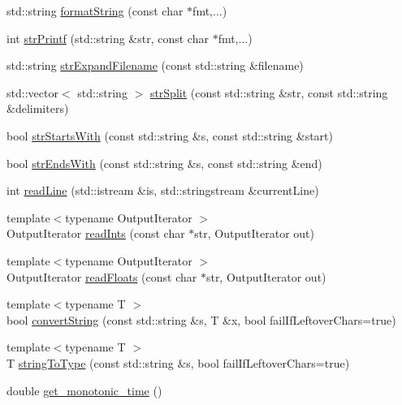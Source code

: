 \begin{DoxyCompactItemize}
\item 
std\+::string \mbox{\hyperlink{group__utils_gadc1d37473e0e8c6a73fb46b19239d2d1}{format\+String}} (const char $\ast$fmt,...)
\item 
int \mbox{\hyperlink{group__utils_gacce5cae59e8c97bf3f4ff581c6534d03}{str\+Printf}} (std\+::string \&str, const char $\ast$fmt,...)
\item 
std\+::string \mbox{\hyperlink{group__utils_ga45c2648d8a8a5f5bed13741bc8a501d1}{str\+Expand\+Filename}} (const std\+::string \&filename)
\item 
std\+::vector$<$ std\+::string $>$ \mbox{\hyperlink{group__utils_ga0a56de67e98afa3f8307e7b4ddb4cc83}{str\+Split}} (const std\+::string \&str, const std\+::string \&delimiters)
\item 
bool \mbox{\hyperlink{group__utils_ga98f10a2fabad17ef7ed1534b39eb2bc5}{str\+Starts\+With}} (const std\+::string \&s, const std\+::string \&start)
\item 
bool \mbox{\hyperlink{group__utils_ga7a0e6ad89c4c86b2b60ddf392a57c963}{str\+Ends\+With}} (const std\+::string \&s, const std\+::string \&end)
\item 
int \mbox{\hyperlink{group__utils_ga570513203e2bbf23d692460c0aef07e8}{read\+Line}} (std\+::istream \&is, std\+::stringstream \&current\+Line)
\item 
{\footnotesize template$<$typename Output\+Iterator $>$ }\\Output\+Iterator \mbox{\hyperlink{group__utils_gae501003a8f6b60afb846857fdb82174d}{read\+Ints}} (const char $\ast$str, Output\+Iterator out)
\item 
{\footnotesize template$<$typename Output\+Iterator $>$ }\\Output\+Iterator \mbox{\hyperlink{group__utils_ga88353c6cfc2e519df07814ca577e71ec}{read\+Floats}} (const char $\ast$str, Output\+Iterator out)
\item 
{\footnotesize template$<$typename T $>$ }\\bool \mbox{\hyperlink{group__utils_ga599c46f6984e9a2147fac39324e9fadc}{convert\+String}} (const std\+::string \&s, T \&x, bool fail\+If\+Leftover\+Chars=true)
\item 
{\footnotesize template$<$typename T $>$ }\\T \mbox{\hyperlink{group__utils_ga9dac39a213d269b8d68fb698bf82873a}{string\+To\+Type}} (const std\+::string \&s, bool fail\+If\+Leftover\+Chars=true)
\item 
double \mbox{\hyperlink{namespaceg2o_af1595a641cd3ed21c3d9739c72a39422}{get\+\_\+monotonic\+\_\+time}} ()

\end{DoxyCompactItemize}
